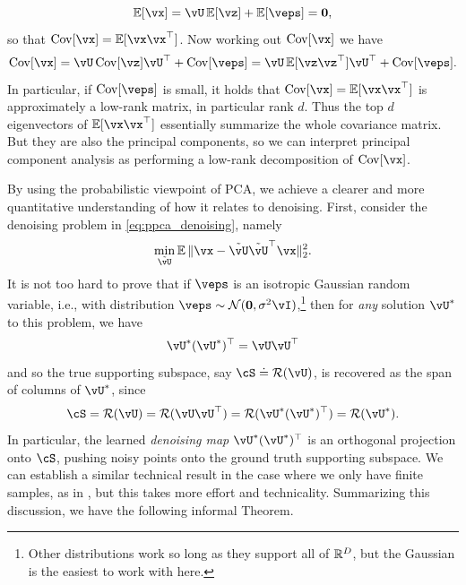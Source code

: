 \documentclass[../../book-main.tex]{subfiles}
\begin{document}
\begin{equation}
    \Ex[\vx] = \vU\Ex[\vz] + \Ex[\veps] = \vzero,
\end{equation}
so that \(\Cov[\vx] = \Ex[\vx\vx^{\top}]\). Now working out \(\Cov[\vx]\) we have 
\begin{equation}
    \Cov[\vx] = \vU\Cov[\vz]\vU^{\top} + \Cov[\veps] = \vU\Ex[\vz\vz^{\top}]\vU^{\top} + \Cov[\veps].
\end{equation}
In particular, if \(\Cov[\veps]\) is small, it holds that \(\Cov[\vx] = \Ex[\vx\vx^{\top}]\) is approximately a low-rank matrix, in particular rank \(d\). Thus the top \(d\) eigenvectors of \(\Ex[\vx\vx^{\top}]\) essentially summarize the whole covariance matrix. But they are also the principal components, so we can interpret principal component analysis as performing a low-rank decomposition of \(\Cov[\vx]\).

\begin{remark}
    By using the probabilistic viewpoint of PCA, we achieve a clearer and more quantitative understanding of how it relates to denoising. First, consider the denoising problem in \eqref{eq:ppca_denoising}, namely
    \begin{equation}
        \min_{\tilde{\vU}}\Ex\norm{\vx - \tilde{\vU}\tilde{\vU}^{\top}\vx}_{2}^{2}.
    \end{equation}
    It is not too hard to prove that if \(\veps\) is an isotropic Gaussian random variable, i.e., with distribution \(\veps \sim \dNorm(\vzero, \sigma^{2}\vI)\),\footnote{Other distributions work so long as they support all of \(\mathbb{R}^{D}\), but the Gaussian is the easiest to work with here.} then for \textit{any} solution \(\vU^{\ast}\) to this problem, we have 
    \begin{equation}
        \vU^{\ast}(\vU^{\ast})^{\top} = \vU\vU^{\top}
    \end{equation}
    and so the true supporting subspace, say \(\cS \doteq \Range(\vU)\), is recovered as the span of columns of \(\vU^{\ast}\), since 
    \begin{equation}
        \cS = \Range(\vU) = \Range(\vU\vU^{\top}) = \Range(\vU^{\ast}(\vU^{\ast})^{\top}) = \Range(\vU^{\ast}).
    \end{equation}
    In particular, the learned \textit{denoising map} \(\vU^{\ast}(\vU^{\ast})^{\top}\) is an orthogonal projection onto \(\cS\), pushing noisy points onto the ground truth supporting subspace. We can establish a similar technical result in the case where we only have finite samples, as in , but this takes more effort and technicality. Summarizing this discussion, we have the following informal Theorem.
\end{remark}
\end{document}
